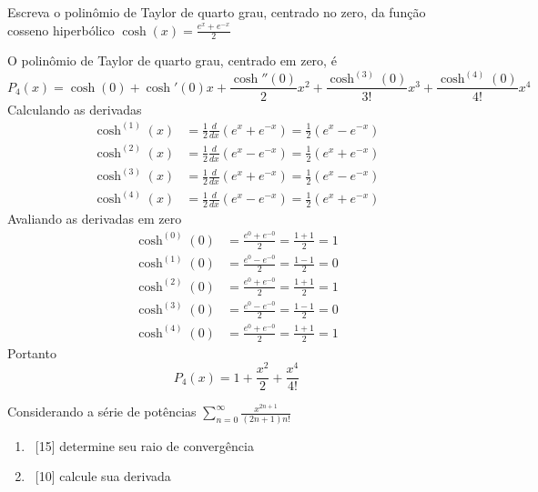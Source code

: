 \documentclass[a4paper,12pt,fleqn]{article}
\begin{document}


Escreva o polinômio de Taylor de quarto grau, centrado no zero,
da função cosseno hiperbólico
\(
  \cosh(x)=\frac{e^x+e^{-x}}{2}
\)

\begin{answer}
  O polinômio de Taylor de quarto grau, centrado em zero, é
  \[
    P_4(x)
    = \cosh(0)
    + \cosh'(0) x
    + \frac{\cosh''(0)}{2}x^2
    + \frac{\cosh^{(3)}(0)}{3!}x^3
    + \frac{\cosh^{(4)}(0)}{4!}x^4
  \]
  Calculando as derivadas
  \begin{align*}
    \cosh^{(1)}(x)
    & = \frac{1}{2}\frac{d}{dx}\left(e^x+e^{-x}\right)
      = \frac{1}{2}\left(e^x-e^{-x}\right) \\[2mm]
    \cosh^{(2)}(x)
    & = \frac{1}{2}\frac{d}{dx}\left(e^x-e^{-x}\right)
      = \frac{1}{2}\left(e^x+e^{-x}\right) \\[2mm]
    \cosh^{(3)}(x)
    & = \frac{1}{2}\frac{d}{dx}\left(e^x+e^{-x}\right)
      = \frac{1}{2}\left(e^x-e^{-x}\right) \\[2mm]
    \cosh^{(4)}(x)
    & = \frac{1}{2}\frac{d}{dx}\left(e^x-e^{-x}\right)
      = \frac{1}{2}\left(e^x+e^{-x}\right)
  \end{align*}
  Avaliando as derivadas em zero
  \begin{align*}
    \cosh^{(0)}(0) & = \frac{e^0+e^{-0}}{2} = \frac{1+1}{2} = 1  \\[2mm]
    \cosh^{(1)}(0) & = \frac{e^0-e^{-0}}{2} = \frac{1-1}{2} = 0  \\[2mm]
    \cosh^{(2)}(0) & = \frac{e^0+e^{-0}}{2} = \frac{1+1}{2} = 1  \\[2mm]
    \cosh^{(3)}(0) & = \frac{e^0-e^{-0}}{2} = \frac{1-1}{2} = 0  \\[2mm]
    \cosh^{(4)}(0) & = \frac{e^0+e^{-0}}{2} = \frac{1+1}{2} = 1
  \end{align*}
  Portanto
  \[
    P_4(x)
    = 1
    + \frac{x^2}{2}
    + \frac{x^4}{4!}
  \]
\end{answer}

Considerando a série de potências
\(
  \sum_{n=0}^\infty \frac{x^{2n+1}}{(2n+1)n!}
\)
\begin{enumerate}[label=\alph*)]
  \item\ [15] determine seu raio de convergência
  \item\ [10] calcule sua derivada
\end{enumerate}
\end{document}

